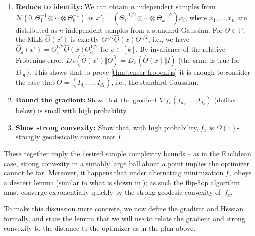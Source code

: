 \documentclass[aos]{imsart}
\theoremstyle{definition}
\numberwithin{equation}{section}
\DeclareMathOperator{\op}{op}
\renewcommand{\P}{{\mathbb{P}}}
\newcommand{\ot}{\otimes}
\newcommand{\cN}{\mathcal{N}}
\newcommand{\samp}{x}
\begin{document}
\begin{enumerate}
\item\label{it:reduce}
\textbf{Reduce to identity:}
We can obtain $n$ independent samples from $\cN(0, \Theta_1^{-1} \ot \cdots \ot \Theta_k^{-1})$ as $x'_i = ( \Theta_1^{-1/2} \ot \cdots \ot \Theta_k^{-1/2} ) x_i$, where $x_1,\dots,x_n$ are distributed as $n$ independent samples from a standard Gaussian.
For $\Theta \in \P$, the MLE $\widehat{\Theta}(x')$ is exactly $\Theta^{1/2} \widehat{\Theta}(x) \Theta^{1/2}$, i.e., we have $\widehat\Theta_a(x') = \Theta_a^{1/2} \widehat\Theta(x) \Theta_a^{1/2}$ for $a\in[k]$.
By invariance of the relative Frobenius error, $D_F(\widehat\Theta(x') \Vert \Theta) = D_F(\widehat\Theta(x) \Vert I)$ (the same is true for $D_{\op}$).
This shows that to prove \cref{thm:tensor-frobenius} it is enough to consider the case that $\Theta = (I_{d_1},\dots,I_{d_k})$, i.e., the standard Gaussian.
\item\label{it:grad} \textbf{Bound the gradient:}
Show that the gradient $\nabla f_x(I_{d_1},\dots,I_{d_k})$ (defined below) is small with high probability.
\item\label{it:convexity} \textbf{Show strong convexity:}
Show that, with high probability, $f_x$ is $\Omega(1)$-strongly geodesically convex near $I$.
\end{enumerate}

These together imply the desired sample complexity bounds -- as in the Euclidean case, strong convexity in a suitably large ball about a point implies the optimizer cannot be far. Moreover, it happens that under alternating minimization $f_\samp$ obeys a descent lemma (similar to what is shown in \cite{burgisser2017alternating}); as such the flip-flop algorithm must converge exponentially quickly by the strong geodesic convexity of~$f_\samp$.

To make this discussion more concrete, we now define the gradient and Hessian formally, and state the lemma that we will use to relate the gradient and strong convexity to the distance to the optimizer as in the plan above.
\end{document}

